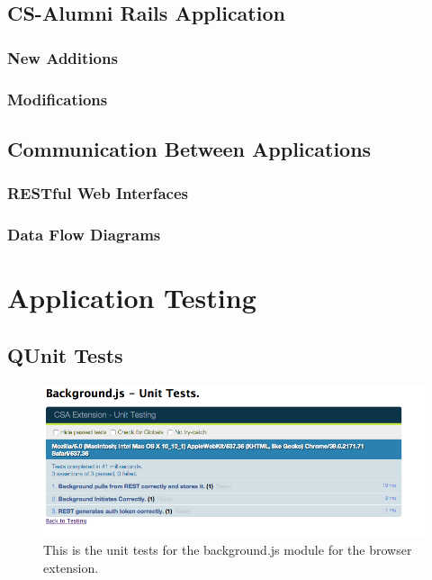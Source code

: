 \documentclass{article}
\begin{document}
\subsection{CS-Alumni Rails Application}

\subsubsection{New Additions}

\subsubsection{Modifications}


\subsection{Communication Between Applications}

\subsubsection{RESTful Web Interfaces}

\subsubsection{Data Flow Diagrams}


\section{Application Testing}

\subsection{QUnit Tests}



\begin{figure}[!htbp]
\centering
\includegraphics[width=\textwidth]{backgroundqunit}
\caption{This is the unit tests for the background.js module for the browser extension.}
\end{figure}
\end{document}
